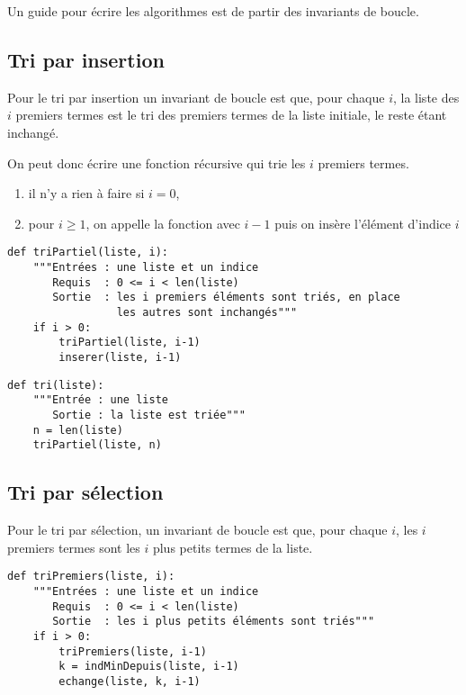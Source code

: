 Un guide pour écrire les algorithmes est de partir des invariants de boucle.
\subsection{Tri par insertion}
Pour le tri par insertion un invariant de boucle est que, pour chaque $i$, la liste des $i$ premiers termes est le tri des premiers termes de la liste initiale, le reste étant inchangé.

On peut donc écrire une fonction récursive qui trie les $i$ premiers termes.
\begin{enumerate}
\item il n'y a rien à faire si $i=0$,
\item pour $i\ge 1$, on appelle la fonction avec $i-1$ puis on insère l'élément d'indice $i$
\end{enumerate}
\begin{lstlisting}
def triPartiel(liste, i):
    """Entrées : une liste et un indice
       Requis  : 0 <= i < len(liste)
       Sortie  : les i premiers éléments sont triés, en place
                 les autres sont inchangés"""
    if i > 0:
        triPartiel(liste, i-1)
        inserer(liste, i-1)
\end{lstlisting}

\begin{lstlisting}
def tri(liste):
    """Entrée : une liste 
       Sortie : la liste est triée"""
    n = len(liste)
    triPartiel(liste, n)
\end{lstlisting}
\subsection{Tri par sélection}
Pour le tri par sélection, un invariant de boucle est que, pour chaque $i$, les $i$ premiers termes sont les $i$ plus petits termes de la liste.
\begin{lstlisting}
def triPremiers(liste, i):
    """Entrées : une liste et un indice
       Requis  : 0 <= i < len(liste)
       Sortie  : les i plus petits éléments sont triés"""
    if i > 0:
        triPremiers(liste, i-1)
        k = indMinDepuis(liste, i-1)
        echange(liste, k, i-1)
\end{lstlisting}


